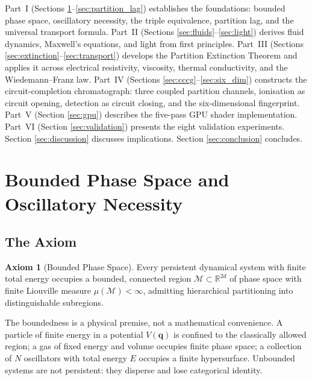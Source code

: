 \documentclass[twocolumn,10pt,a4paper]{article}
\theoremstyle{definition}
\newtheorem{axiom}{Axiom}
\theoremstyle{remark}
\newcommand{\Mspace}{\mathcal{M}}
\newcommand{\Real}{\mathbb{R}}
\begin{document}
Part~I (Sections \ref{sec:foundations}--\ref{sec:partition_lag}) establishes the foundations: bounded phase space, oscillatory necessity, the triple equivalence, partition lag, and the universal transport formula. Part~II (Sections \ref{sec:fluids}--\ref{sec:light}) derives fluid dynamics, Maxwell's equations, and light from first principles. Part~III (Sections \ref{sec:extinction}--\ref{sec:transport}) develops the Partition Extinction Theorem and applies it across electrical resistivity, viscosity, thermal conductivity, and the Wiedemann--Franz law. Part~IV (Sections \ref{sec:cccg}--\ref{sec:six_dim}) constructs the circuit-completion chromatograph: three coupled partition channels, ionisation as circuit opening, detection as circuit closing, and the six-dimensional fingerprint. Part~V (Section \ref{sec:gpu}) describes the five-pass GPU shader implementation. Part~VI (Section \ref{sec:validation}) presents the eight validation experiments. Section \ref{sec:discussion} discusses implications. Section \ref{sec:conclusion} concludes.

\section{Bounded Phase Space and Oscillatory Necessity}
\label{sec:foundations}

\subsection{The Axiom}

\begin{axiom}[Bounded Phase Space]
\label{ax:bounded}
Every persistent dynamical system with finite total energy occupies a bounded, connected region $\Mspace \subset \Real^{2d}$ of phase space with finite Liouville measure $\mu(\Mspace) < \infty$, admitting hierarchical partitioning into distinguishable subregions.
\end{axiom}

The boundedness is a physical premise, not a mathematical convenience. A particle of finite energy in a potential $V(\mathbf{q})$ is confined to the classically allowed region; a gas of fixed energy and volume occupies finite phase space; a collection of $N$ oscillators with total energy $E$ occupies a finite hypersurface. Unbounded systems are not persistent: they disperse and lose categorical identity.
\end{document}
